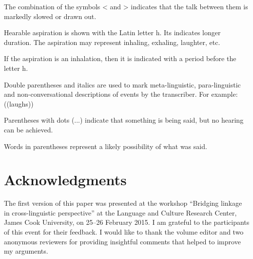 \documentclass[output=paper]{LSP/langsci}
\begin{document}
\begin{description}
\item The combination of the symbols < and > indicates that the talk between them is markedly slowed or drawn out. 
\item Hearable aspiration is shown with the Latin letter h. Its  indicates longer duration. The aspiration may represent inhaling, exhaling, laughter, etc. 
\item If the aspiration is an inhalation, then it is indicated with a period before the letter h. 
\item Double parentheses and italics are used to mark meta-linguistic, para-linguistic and non-conversational descriptions of events by the transcriber. For example: ((laughs))
\item  Parentheses with dots (...) indicate that something is being said, but no hearing can be achieved. 
\item Words in parentheses represent a likely possibility of what was said. 
\end{description}



\section*{ Acknowledgments}
The first version of this paper was presented at the workshop ``Bridging linkage in cross-linguistic perspective'' at the Language and Culture Research Center, James Cook University, on 25--26 February 2015. I am grateful to the participants of this event for their feedback. I would like to thank the volume editor and two anonymous reviewers for providing insightful comments that helped to improve my arguments. 

\sloppy

\printbibliography[heading=subbibliography,notkeyword=this] 
\end{document}
